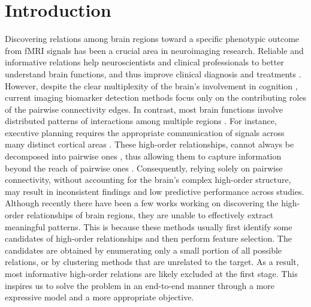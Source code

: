 \section{Introduction}
\label{sec:hybrid-intro}


Discovering relations among brain regions toward a specific phenotypic outcome from fMRI signals has been a crucial area in neuroimaging research. Reliable and informative relations help neuroscientists and clinical professionals to better understand brain functions, and thus improve clinical diagnosis and treatments \citep{kucian2008development,kucian2006impaired, li2015putting,li2015toward,satterthwaite2015linked,wang2016efficient}.
However, despite the clear multiplexity of the brain's involvement in cognition \citep{logue2014neural,barrasso2016neurobiological,knauff2010complex,reineberg2022context}, current imaging biomarker detection methods \citep{shen2017using,gao2019combining,li2021braingnn} focus only on the contributing roles of the pairwise connectivity edges. In contrast, most brain functions involve distributed patterns of interactions among multiple regions \citep{semedo2019cortical}. For instance, executive planning requires the appropriate communication of signals across many distinct cortical areas \citep{logue2014neural}. 
These high-order relationships, cannot always be decomposed into pairwise ones \citep{battiston2020networks, battiston2021physics, bick2023higher}, thus allowing them to capture information beyond the reach of pairwise ones \citep{do2020structural}. Consequently, relying solely on pairwise connectivity, without accounting for the brain's complex high-order structure, may result in inconsistent findings and low predictive performance across studies. 
Although recently there have been a few works \citep{zu2016identifying,xiao2019multi,li2022construction} working on discovering the high-order relationships of brain regions, they are unable to effectively extract meaningful patterns. This is because these methods usually first identify some candidates of high-order relationships and then perform feature selection. The candidates are obtained by enumerating only a small portion of all possible relations, or by clustering methods that are unrelated to the target. As a result, most informative high-order relations are likely excluded at the first stage. This inspires us to solve the problem in an end-to-end manner through a more expressive model and a more appropriate objective.


